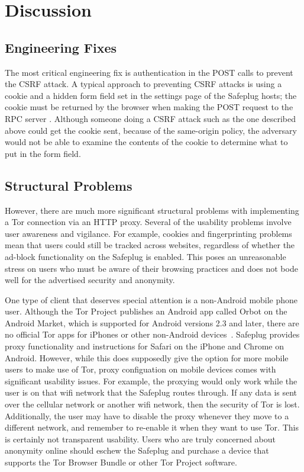 \documentclass[conference]{IEEEtran}
\begin{document}
\section{Discussion}
\subsection{Engineering Fixes}
The most critical engineering fix is authentication in the POST calls to prevent the CSRF attack.  A typical approach to preventing CSRF attacks is using a cookie and a hidden form field set in the settings page of the Safeplug hosts; the cookie must be returned by the browser when making the POST request to the RPC server \cite{csrfdef}.  Although someone doing a CSRF attack such as the one described above could get the cookie sent, because of the same-origin policy, the adversary would not be able to examine the contents of the cookie to determine what to put in the form field.

\subsection{Structural Problems}
However, there are much more significant structural problems with implementing a Tor connection via an HTTP proxy.  Several of the usability problems involve user awareness and vigilance.  For example, cookies and fingerprinting problems mean that users could still be tracked across websites, regardless of whether the ad-block functionality on the Safeplug is enabled.  This poses an unreasonable stress on users who must be aware of their browsing practices and does not bode well for the advertised security and anonymity.

One type of client that deserves special attention is a non-Android mobile phone user.  Although the Tor Project publishes an Android app called Orbot on the Android Market, which is supported for Android versions 2.3 and later, there are no official Tor apps for iPhones or other non-Android devices~\cite{orbot,amorbot}.  Safeplug provides proxy functionality and instructions for Safari on the iPhone and Chrome on Android.  However, while this does supposedly give the option for more mobile users to make use of Tor, proxy configuation on mobile devices comes with significant usability issues.  For example, the proxying would only work while the user is on that wifi network that the Safeplug routes through.  If any data is sent over the cellular network or another wifi network, then the security of Tor is lost.  Additionally, the user may have to disable the proxy whenever they move to a different network, and remember to re-enable it when they want to use Tor.  This is certainly not transparent usability.  Users who are truly concerned about anonymity online should eschew the Safeplug and purchase a device that supports the Tor Browser Bundle or other Tor Project software.
\end{document}
